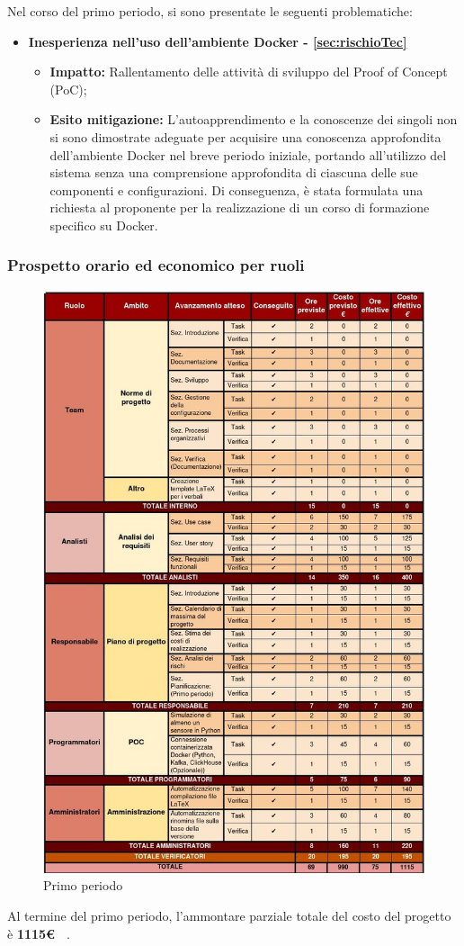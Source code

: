 \documentclass{article}
\begin{document}
Nel corso del primo periodo, si sono presentate le seguenti problematiche:
\begin{itemize}
    \item \textbf{Inesperienza nell'uso dell'ambiente Docker - \ref{sec:rischioTec}}
          \begin{itemize}
              \item \textbf{Impatto:} Rallentamento delle attività di sviluppo del Proof of Concept (PoC);
              \item \textbf{Esito mitigazione:}  L'autoapprendimento e la conoscenze dei singoli non si sono dimostrate adeguate per acquisire una conoscenza approfondita dell'ambiente Docker nel breve periodo iniziale,
                    portando all'utilizzo del sistema senza una comprensione approfondita di ciascuna delle sue componenti e configurazioni. Di conseguenza,
                    è stata formulata una richiesta al proponente per la realizzazione di un corso di formazione specifico su Docker.
          \end{itemize}
\end{itemize}
\subsubsection*{Prospetto orario ed economico per ruoli}

\begin{figure}[H]
    \centering
    \includegraphics[height=1.1\textwidth]{../Images/periodo1.jpg}
    \caption{Primo periodo}
    \label{fig:UC1}
\end{figure}

Al termine del primo periodo, l'ammontare parziale totale del costo del progetto è \textbf{ 1115\euro\ } .
\end{document}
